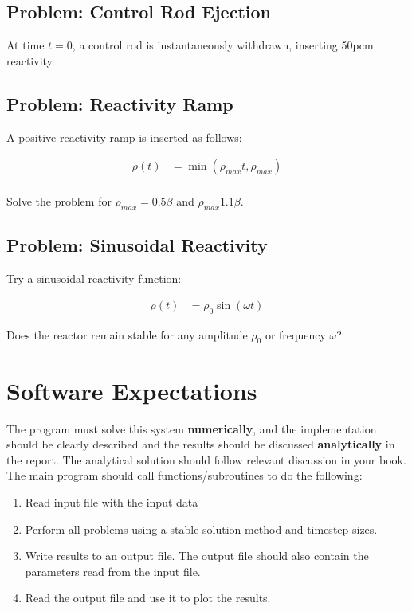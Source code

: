 \documentclass{article}
\begin{document}
\subsection{Problem: Control Rod Ejection}

At time $t=0$, a control rod is instantaneously withdrawn, inserting 50pcm  reactivity. 

\subsection{Problem: Reactivity Ramp}
A positive reactivity ramp is inserted as follows:

\begin{align}
        \rho(t) &= \min(\rho_{max}t, \rho_{max})\\
\end{align}

Solve the problem for $\rho_{max} = 0.5\beta$ and $\rho_{max} 1.1\beta$.


\subsection{Problem: Sinusoidal Reactivity}

Try a sinusoidal reactivity function:

\begin{align}
        \rho(t) &= \rho_0 \sin{(\omega t)}
\end{align}

Does the reactor remain stable for any amplitude $\rho_0$ or frequency 
$\omega$?

\section{Software Expectations}

The program must solve this system \textbf{numerically}, and the 
implementation should be clearly described and the results should be discussed 
\textbf{analytically} in the report.  The analytical solution 
should follow relevant discussion in your book.  The main program should 
call functions/subroutines to do the following:

\begin{enumerate}
        \item Read input file with the input data
        \item Perform all problems using a stable solution method and 
                timestep sizes.
        \item Write results to an output file.  The output file should also 
                contain the parameters read from the input file.
        \item Read the output file and use it to plot the results.
\end{enumerate}
\end{document}
